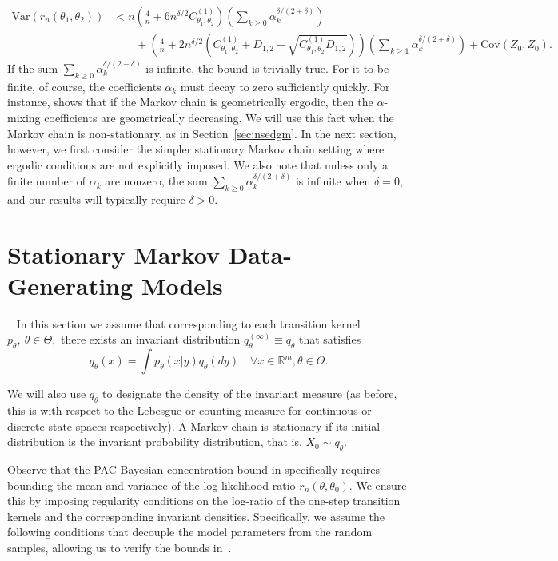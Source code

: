 \documentclass[11pt]{amsart}
\newcommand{\Var}{\mathrm{Var}}
\newcommand{\Cov}{\mathrm{Cov}}
\begin{document}
\begin{align}
    \nonumber
    \Var \left( r_n(\theta_1,\theta_2) \right) & < n\left(\frac{4}{n}+6n^{\delta/2}C_{\theta_1,\theta_2}^{(1)}\right)  \left(\sum_{k\geq 0}\alpha_{k}^{\delta/(2+\delta)}\right)\\
     &\qquad+ \left(\frac{4}{n}+2n^{\delta/2}(C_{\theta_1,\theta_2}^{(1)}+D_{1,2}+\sqrt{C_{\theta_1,\theta_2}^{(1)}D_{1,2}})\right)\left(\sum_{k\geq 1} \alpha_k^{\delta/(2+\delta)}\right) + \Cov(Z_0,Z_0).
\end{align}
If the sum $\sum_{k \geq 0} \alpha_{k}^{\delta/(2+\delta)}$ is infinite, the bound is trivially true. 
For it to be finite, of course, the coefficients $\alpha_k$ must decay to zero sufficiently quickly. 
For instance,  shows that if the Markov chain is geometrically ergodic, then the $\alpha$-mixing coefficients are geometrically decreasing. We will use this fact when the Markov chain is non-stationary, as in Section~\ref{sec:nsedgm}. In the next section, however, we first consider the simpler stationary Markov chain setting where ergodic conditions are not explicitly imposed. We also note that unless only a finite number of $\alpha_k$ are nonzero, the sum $\sum_{k \geq 0} \alpha_{k}^{\delta/(2+\delta)}$ is infinite when $\delta=0$, and our results will typically require $\delta >0$.

\textcolor{purple}{}


\section{Stationary Markov Data-Generating Models}~\label{sec:sedgm}
 In this section we assume that corresponding to each transition kernel $p_{\theta},~\theta \in \Theta,$ there exists an invariant distribution $q^{(\infty)}_\theta \equiv q_{\theta}$ that satisfies
\[
    q_\theta(x) = \int p_\theta(x|y) q_\theta(dy) \quad \forall x \in \mathbb R^m, \theta \in \Theta.
\]

We will also use $q_\theta$ to designate the density of the invariant measure (as before, this is with respect to the Lebesgue or counting measure for continuous or discrete state spaces respectively). A Markov chain is stationary if its initial distribution is the invariant probability distribution, %
that is, $X_0\sim q_{\theta}$.

Observe that the PAC-Bayesian concentration bound in  specifically requires bounding the mean and variance of the log-likelihood ratio $r_n(\theta,\theta_0)$. 
We ensure this by imposing regularity conditions on the log-ratio of the one-step transition kernels and the corresponding invariant densities. Specifically, we assume the following conditions that decouple the model parameters from the random samples, allowing us to verify the bounds in~.
\end{document}
